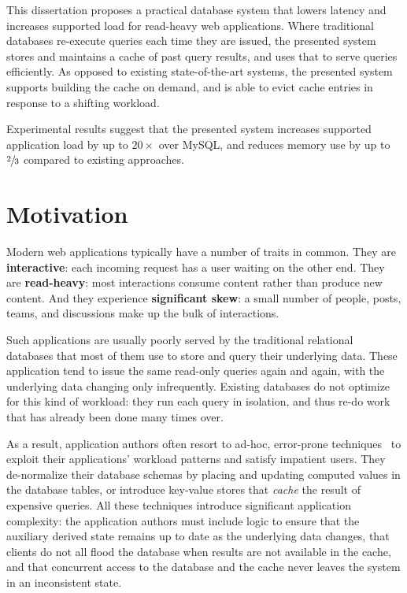 This dissertation proposes a practical database system that lowers latency and
increases supported load for read-heavy web applications. Where traditional
databases re-execute queries each time they are issued, the presented system
stores and maintains a cache of past query results, and uses that to serve
queries efficiently. As opposed to existing state-of-the-art systems, the
presented system supports building the cache on demand, and is able to evict
cache entries in response to a shifting workload.

Experimental results suggest that the presented system increases supported
application load by up to $20\times$ over MySQL, and reduces memory use by up to
$\sfrac{2}{3}$ compared to existing approaches.

\section{Motivation}

Modern web applications typically have a number of traits in common. They are
\textbf{interactive}: each incoming request has a user waiting on the other end.
They are \textbf{read-heavy}: most interactions consume content rather than
produce new content. And they experience \textbf{significant skew}: a small
number of people, posts, teams, and discussions make up the bulk of
interactions.

Such applications are usually poorly served by the traditional relational
databases that most of them use to store and query their underlying data.
These application tend to issue the same read-only queries again and again, with
the underlying data changing only infrequently. Existing databases do
not optimize for this kind of workload: they run each query in isolation, and
thus re-do work that has already been done many times over.

As a result, application authors often resort to ad-hoc, error-prone
techniques~\cite{ad-hoc-caching} to exploit their applications' workload
patterns and satisfy impatient users. They de-normalize their database schemas
by placing and updating computed values in the database tables, or introduce
key-value stores that \textit{cache} the result of expensive queries. All these
techniques introduce significant application complexity: the application authors
must include logic to ensure that the auxiliary derived state remains up to date
as the underlying data changes, that clients do not all flood the database when
results are not available in the cache, and that concurrent access to the
database and the cache never leaves the system in an inconsistent state.

